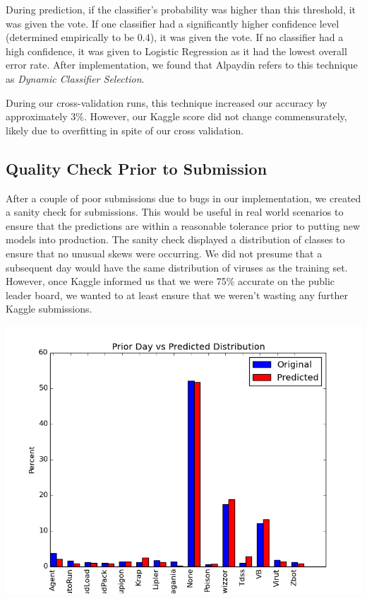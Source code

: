 \documentclass[11pt, oneside]{article}   	%
\begin{document}
During prediction, if the classifier's probability was higher than this threshold, it was given the vote. If one classifier had a significantly higher confidence level (determined empirically to be 0.4), it was given the vote. If no classifier had a high confidence, it was given to Logistic Regression as it had the lowest overall error rate. After implementation, we found that Alpaydin refers to this technique as \emph{Dynamic Classifier Selection}.\cite{alpaydin}



During our cross-validation runs, this technique increased our accuracy by approximately 3\%. However, our Kaggle score did not change commensurately, likely due to overfitting in spite of our cross validation. 


\subsection*{Quality Check Prior to Submission}

After a couple of poor submissions due to bugs in our implementation, we created a sanity check for submissions. This would be useful in real world scenarios to ensure that the predictions are within a reasonable tolerance prior to putting new models into production. The sanity check displayed a distribution of classes to ensure that no unusual skews were occurring. We did not presume that a subsequent day would have the same distribution of viruses as the training set. However, once Kaggle informed us that we were 75\% accurate on the public leader board, we wanted to at least ensure that we weren't wasting any further Kaggle submissions. 
\begin{center}
\includegraphics[scale=.65]{predictVactual}
\end{center}
\end{document}

